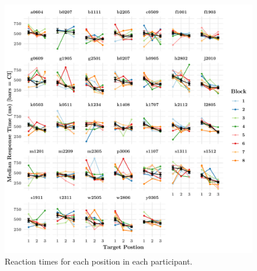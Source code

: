 \documentclass[11pt]{article}
\begin{document}
\begin{figure}[H]
	\includegraphics[width=\textwidth]{exp3fig2.pdf}
	\caption{Reaction times for each position in each participant.}
	\label{fig:Fig. 3}
\end{figure}
\end{document}
